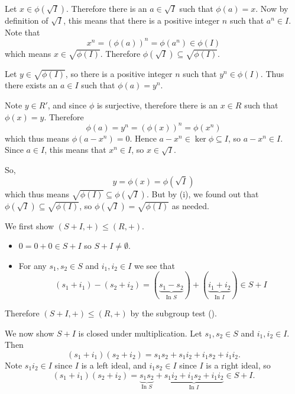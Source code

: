 \begin{questions}
    \item \begin{partquestions}{\roman*}
        \item Let $x \in \phi(\sqrt I)$. Therefore there is an $a \in \sqrt{I}$ such that $\phi(a) = x$. Now by definition of $\sqrt{I}$, this means that there is a positive integer $n$ such that $a^n \in I$. Note that
        \[
            x^n = \left(\phi(a)\right)^n = \phi(a^n) \in \phi(I)
        \]
        which means $x \in \sqrt{\phi(I)}$. Therefore $\phi(\sqrt I) \subseteq \sqrt{\phi(I)}$.

        \item Let $y \in \sqrt{\phi(I)}$, so there is a positive integer $n$ such that $y^n \in \phi(I)$. Thus there exists an $a \in I$ such that $\phi(a) = y^n$.
        
        Note $y \in R'$, and since $\phi$ is surjective, therefore there is an $x \in R$ such that $\phi(x) = y$. Therefore
        \[
            \phi(a) = y^n = \left(\phi(x)\right)^n = \phi\left(x^n\right)
        \]
        which thus means $\phi(a-x^n) = 0$. Hence $a-x^n \in \ker\phi \subseteq I$, so $a-x^n \in I$. Since $a \in I$, this means that $x^n \in I$, so $x \in \sqrt{I}$.

        So,
        \[
            y = \phi(x) = \phi(\sqrt I)
        \]
        which thus means $\sqrt{\phi(I)} \subseteq \phi(\sqrt I)$. But by (i), we found out that $\phi(\sqrt I) \subseteq \sqrt{\phi(I)}$, so $\phi(\sqrt I) = \sqrt{\phi(I)}$ as needed.
    \end{partquestions}

    \item \begin{partquestions}{\roman*}
        \item We first show $(S+I, +) \leq (R,+)$.
        \begin{itemize}
            \item $0 = 0 + 0 \in S + I$ so $S + I \neq \emptyset$.
            \item For any $s_1, s_2 \in S$ and $i_1, i_2 \in I$ we see that
            \[
                (s_1+i_1) - (s_2 + i_2) = (\underbrace{s_1 - s_2}_{\text{In }S}) + (\underbrace{i_1 + i_2}_{\text{In }I}) \in S + I
            \]
        \end{itemize}
        Therefore $(S+I, +) \leq (R,+)$ by the subgroup test ().

        We now show $S+I$ is closed under multiplication. Let $s_1, s_2 \in S$ and $i_1, i_2 \in I$. Then
        \[
            (s_1 + i_1)(s_2 + i_2) = s_1s_2 + s_1i_2 + i_1s_2 + i_1i_2.
        \]
        Note $s_1i_2 \in I$ since $I$ is a left ideal, and $i_1s_2 \in I$ since $I$ is a right ideal, so
        \[
            (s_1 + i_1)(s_2 + i_2) = \underbrace{s_1s_2}_{\text{In }S} + \underbrace{s_1i_2 + i_1s_2 + i_1i_2}_{\text{In }I} \in S + I.
        \]


\end{partquestions}
\end{questions}
